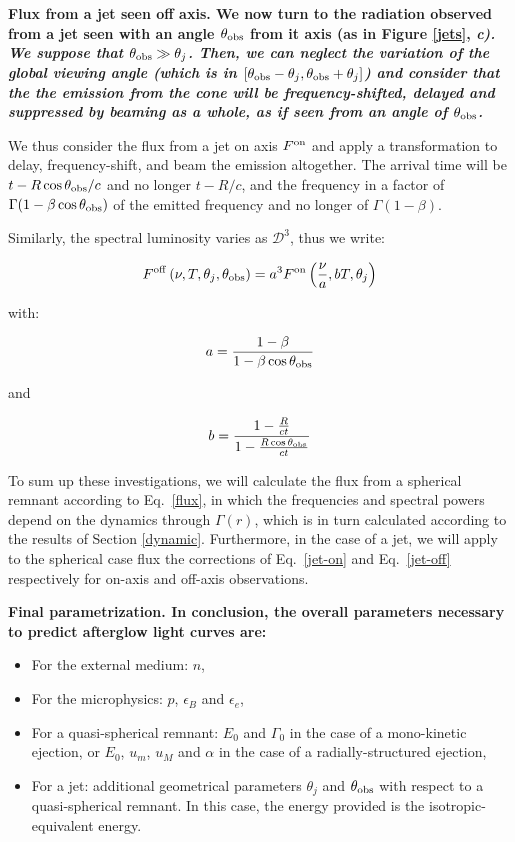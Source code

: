 \label{jjj}
\bf{Flux from a jet seen off axis.} We now turn to the radiation observed from a jet seen with an angle $\thetaobs$ from it axis (as in Figure \ref{jets}, \it{c}). We suppose that $\thetaobs \gg \theta_j$. Then, we can neglect the variation of the global viewing angle (which is in $[\thetaobs - \theta_j, \thetaobs + \theta_j]$) and consider that the the emission from the cone will be frequency-shifted, delayed and suppressed by beaming as a whole, as if seen from an angle of $\thetaobs$.

We thus consider the flux from a jet on axis $F^{\rm{on}}$ and apply a transformation to delay, frequency-shift, and beam the emission altogether. The arrival time will be $t - R\cos\thetaobs/c$ and no longer $t - R/c$, and the frequency in a factor of $\Gamma(1 - \beta \cos \thetaobs)$ of the emitted frequency and no longer of $\Gamma(1 - \beta)$.

Similarly, the spectral luminosity varies as $\mathcal{D}^3$, thus we write:

\begin{equation}
    \label{jet-off}
    F^{\rm{off}}\left(\nu, T, \theta_j, \thetaobs\right) = a ^ 3 F^{\rm{on}}\left(\frac{\nu}{a}, bT, \theta_j\right)
\end{equation}

with:

\begin{equation}a = \frac{1 - \beta}{1 - \beta \cos\thetaobs}\end{equation}

and

\begin{equation}b = \frac{1 - \frac{R}{ct}}{1 - \frac{R\cos\thetaobs}{ct}}\end{equation}


To sum up these investigations, we will calculate the flux from a spherical remnant according to Eq.~\ref{flux}, in which the frequencies and spectral powers depend on the dynamics through $\Gamma(r)$, which is in turn calculated according to the results of Section \ref{dynamic}. Furthermore, in the case of a jet, we will apply to the spherical case flux the corrections of Eq.~\ref{jet-on} and Eq.~\ref{jet-off} respectively for on-axis and off-axis observations.

\bf{Final parametrization. }In conclusion, the overall parameters necessary to predict afterglow light curves are:

\begin{itemize}
	\item For the external medium: $n$,
    \item For the microphysics: $p$, $\epsilon_B$ and $\epsilon_e$,
	\item For a quasi-spherical remnant: $E_0$ and $\Gamma_0$ in the case of a mono-kinetic ejection, or $E_0$, $u_m$, $u_M$ and $\alpha$ in the case of a radially-structured ejection,
	\item For a jet: additional geometrical parameters $\theta_j$ and $\theta_{\rm{obs}}$ with respect to a quasi-spherical remnant. In this case, the energy provided is the isotropic-equivalent energy.
\end{itemize}


